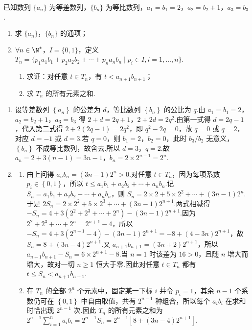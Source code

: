 \documentclass[UTF8,a4paper,oneside,11pt]{ctexbook}
\begin{document}
\begin{problem}
已知数列 \(\{a_n\}\) 为等差数列，\(\{b_n\}\) 为等比数列，\(a_1=b_1=2\)，\(a_2=b_2+1\)，\(a_3=b_3\).
\begin{enumerate}
\item 求 \(\{a_n\}\)，\(\{b_n\}\) 的通项；
\item \(\forall n\in\N^*\)，\(I=\{0,1\}\)，定义 \(T_n=\{p_1a_1b_1+p_2a_2b_2+\cdots+p_na_nb_n\mid p_i\in I,i=1,\dots,n\}\).
\begin{enumerate}
\item 求证：对任意 \(t\in T_n\)，有 \(t<a_{n+1}b_{n+1}\)；
\item 求 \(T_n\) 的所有元素之和.
\end{enumerate}
\end{enumerate}
\end{problem}

\begin{solution}
\begin{enumerate}
\item 设等差数列 \(\left\{a_n\right\}\) 的公差为 \(d\)，等比数列 \(\left\{b_n\right\}\) 的公比为 \(q\).由 \(a_1=b_1=2\)，\(a_2=b_2+1\)，\(a_3=b_3\) 得 \(2+d=2q+1\)，\(2+2d=2q^2\).由第一式得 \(d=2q-1\)，代入第二式得 \(2+2\left(2q-1\right)=2q^2\)，即 \(q^2-2q=0\)，故 \(q=0\) 或 \(q=2\)，对应 \(d=-1\) 或 \(d=3\).若 \(q=0\)，则 \(b_1=2\)，\(b_2=0\)，此时 \(b_3/b_2\) 无意义，\(\left\{b_n\right\}\) 不成等比数列，故舍去.所以 \(d=3\)，\(q=2\).故 \(a_n=2+3\left(n-1\right)=3n-1\)，\(b_n=2\times 2^{n-1}=2^n\).
\item
\begin{enumerate}
\item 由上问得 \(a_nb_n=\left(3n-1\right)2^n>0\).对任意 \(t\in T_n\)，因为每项系数 \(p_i\in\left\{0,1\right\}\)，所以 \(t\le a_1b_1+a_2b_2+\cdots+a_nb_n\).记 \(S_n=a_1b_1+a_2b_2+\cdots+a_nb_n\)，则 \(S_n=2\times 2+5\times 2^2+\cdots+\left(3n-1\right)2^n\).于是 \(2S_n=2\times 2^2+5\times 2^3+\cdots+\left(3n-1\right)2^{n+1}\).两式相减得 \(-S_n=4+3\left(2^2+2^3+\cdots+2^n\right)-\left(3n-1\right)2^{n+1}\).因为 \(2^2+2^3+\cdots+2^n=2^{n+1}-4\)，所以 \(-S_n=4+3\left(2^{n+1}-4\right)-\left(3n-1\right)2^{n+1}=-8+\left(4-3n\right)2^{n+1}\)，故 \(S_n=8+\left(3n-4\right)2^{n+1}\).又 \(a_{n+1}b_{n+1}=\left(3n+2\right)2^{n+1}\)，所以 \(a_{n+1}b_{n+1}-S_n=6\times 2^{n+1}-8\).当 \(n=1\) 时该差为 \(16>0\)，且随 \(n\) 增大而增大，故对一切 \(n\ge 1\) 恒大于零.因此对任意 \(t\in T_n\) 都有 \(t\le S_n<a_{n+1}b_{n+1}\).
\item 在 \(T_n\) 的全部 \(2^n\) 个元素中，固定某一下标 \(i\) 并令 \(p_i=1\)，其余 \(n-1\) 个系数仍可在 \(\left\{0,1\right\}\) 中自由取值，共有 \(2^{n-1}\) 种组合，所以每个 \(a_ib_i\) 在求和时恰出现 \(2^{n-1}\) 次.因此 \(T_n\) 的所有元素之和为 \(2^{n-1}\sum_{i=1}^n a_ib_i=2^{n-1}S_n=2^{n-1}\left[8+\left(3n-4\right)2^{n+1}\right]\).
\end{enumerate}
\end{enumerate}
\end{solution}
\end{document}
